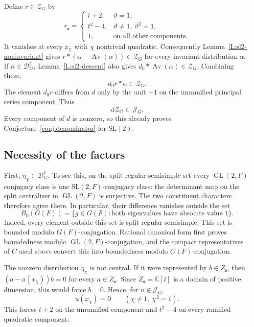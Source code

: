 \documentclass[11pt,a4paper]{amsart}
\newcommand{\mcD}{\mathcal D}
\newcommand{\mcZ}{\mathcal Z}
\newcommand{\mcJ}{\mathcal J}
\theoremstyle{definition}
\theoremstyle{remark}
\DeclareMathOperator{\GL}{GL}
\newcommand{\grs}{\mathfrak s}
\begin{document}
Define $r\in\mcZ_G$ by
$$
 r_{\grs}=\begin{cases}
 t+2,&\vartheta=1,\\
 t^2-4,&\vartheta\ne1,\ \vartheta^2=1,\\
 1,&\text{on all other components}.
 \end{cases}
$$
It vanishes at every $x_\chi$ with $\chi$ nontrivial quadratic.
Consequently Lemma~\ref{L:sl2-noninvariant} gives
$r*(\alpha-\operatorname{Av}(\alpha))\in\mcZ_G$ for every
invariant distribution $\alpha$. If $\alpha\in\mcD_G^c$,
Lemma~\ref{L:sl2-descent} also gives
$d_0*\operatorname{Av}(\alpha)\in\mcZ_G$. Combining these,
$$
 d_0r*\alpha\in\mcZ_G.
$$
The element $d_0r$ differs from $d$ only by the unit $-1$ on the
unramified principal series component. Thus
\begin{equation}\label{eq:sl2-sufficiency}
 d\mcZ_G\subset\mcJ_G.
\end{equation}
Every component of $d$ is nonzero, so this already proves
Conjecture~\ref{conj:denominator} for $\mathrm{SL}(2)$.

\subsection{Necessity of the factors}
First, $\eta_\chi\in\mcD_G^c$. To see this, on the split regular
semisimple set every $\GL(2,F)$-conjugacy class is one
$\mathrm{SL}(2,F)$-conjugacy class: the determinant map on the
split centralizer in $\GL(2,F)$ is surjective. The two constituent
characters therefore agree there. In particular, their difference
vanishes outside the set
$$
 B_0(G(F))=\{g\in G(F):\text{both eigenvalues have absolute value }1\}.
$$
Indeed, every element outside this set is split regular semisimple.
This set is bounded modulo $G(F)$-conjugation. Rational canonical
form first proves boundedness modulo $\GL(2,F)$-conjugation, and
the compact representatives of $C$ used above convert this into
boundedness modulo $G(F)$-conjugation.

The nonzero distribution $\eta_\chi$ is not central. If it were
represented by $b\in Z_{\grs}$, then
$(a-a(x_\chi))b=0$ for every $a\in Z_{\grs}$. Since
$Z_{\grs}=\mathbb C[t]$ is a domain of positive dimension, this
would force $b=0$. Hence, for $u\in\mcJ_G$,
$$
 u(x_\chi)=0\qquad(\chi\ne1,\ \chi^2=1).
$$
This forces $t+2$ on the unramified component and $t^2-4$ on every
ramified quadratic component.
\end{document}
